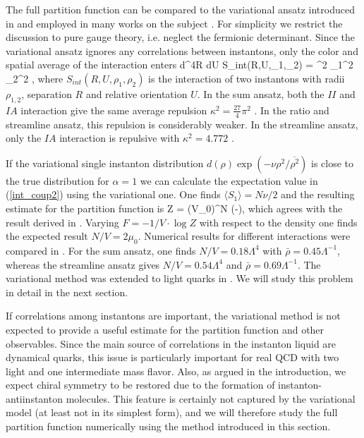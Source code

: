     The full partition function can be compared to the variational
ansatz introduced in \cite{DP_84} and employed in many works on
the subject \cite{Shu_87,DM_88,IS_89,NVZ_89,Ver_91,IS_94}. For
simplicity we restrict the discussion to pure gauge theory, i.e.
neglect the fermionic determinant. Since the variational ansatz
ignores any correlations between instantons, only the color and
spatial average of the interaction enters
\be
 \int d^4R dU S_{int}(R,U,\rho_1,\rho_2)
    = \kappa^2 \rho_1^2 \rho_2^2 ,
\ee
where $S_{int}(R,U,\rho_1,\rho_2)$ is the interaction of two instantons
with radii $\rho_{1,2}$, separation $R$ and relative orientation $U$.
In the sum ansatz, both the $II$ and $IA$ interaction give the same
average repulsion $\kappa^2=\frac{27}{4}\pi^2$ \cite{DP_84}. In the
ratio and streamline ansatz, this repulsion is considerably weaker.
In the streamline ansatz, only the $IA$ interaction is repulsive with
$\kappa^2=4.772$ \cite{Ver_91}.

    If the variational single instanton distribution $d(\rho)\exp
(-\nu\rho^2/\overline{\rho^2})$ is close to the true distribution
for $\alpha=1$ we can calculate the expectation value in
(\ref{int_coup2}) using the variational one. One finds $\langle
S_1\rangle =N\nu/2$ and the resulting estimate for the partition
function is
\be
\label{Z_var}
    Z =  (V\mu_0)^N \exp(-),
\ee
which agrees with the result derived in \cite{DP_84}. Varying
$F=-1/V\cdot\log Z$ with respect to the density one finds the
expected result $N/V=2\mu_0$. Numerical results for different
interactions were compared in \cite{Shu_85,Ver_91}. For the
sum ansatz, one finds $N/V=0.18 \Lambda^4$ with $\bar\rho=0.45
\Lambda^{-1}$, whereas the streamline ansatz gives $N/V=0.54
\Lambda^4$ and $\bar\rho=0.69\Lambda^{-1}$. The variational
method was extended to light quarks in \cite{DP_85,NVZ_89}.
We will study this problem in detail in the next section.

    If correlations among instantons are important, the variational
method is not expected to provide a useful estimate for the
partition function and other observables. Since the main source
of correlations in the instanton liquid are dynamical quarks, this
issue is particularly important for real QCD with two light
and one intermediate mass flavor. Also, as argued in the introduction,
we expect chiral symmetry to be restored due to the formation of
instanton-antiinstanton molecules. This feature is certainly not
captured by the variational model (at least not in its simplest
form), and we will therefore study the full partition function
numerically using the method introduced in this section.

